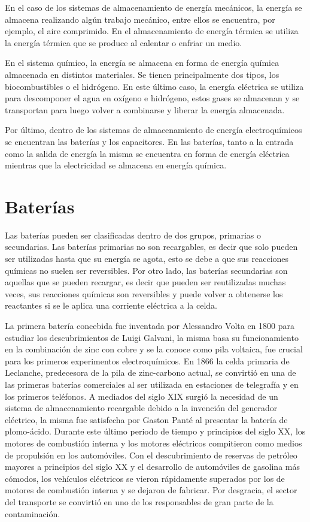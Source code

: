 En el caso de los sistemas de almacenamiento de energía mecánicos, la energía se
almacena realizando algún trabajo mecánico, entre ellos se encuentra, por ejemplo,
el aire comprimido. En el almacenamiento de energía térmica se utiliza la energía 
térmica que se produce al calentar o enfriar un medio.

En el sistema químico, la energía se almacena en forma de energía química 
almacenada en distintos materiales. Se tienen principalmente dos tipos, los
biocombustibles o el hidrógeno. En este último caso, la energía eléctrica se 
utiliza para descomponer el agua en oxígeno e hidrógeno, estos gases se almacenan 
y se transportan para luego volver a combinarse y liberar la energía almacenada.

Por último, dentro de los sistemas de almacenamiento de energía electroquímicos 
se encuentran las baterías y los capacitores. En las baterías, tanto a la entrada 
como la salida de energía la misma se encuentra en forma de energía eléctrica 
mientras que la electricidad se almacena en energía química. 


\section{Baterías}

Las baterías pueden ser clasificadas dentro de dos grupos, primarias o 
secundarias. Las baterías primarias no son recargables, es decir que solo pueden
ser utilizadas hasta que su energía se agota, esto se debe a que sus reacciones
químicas no suelen ser reversibles. Por otro lado, las baterías secundarias son 
aquellas que se pueden recargar, es decir que pueden ser reutilizadas muchas 
veces, sus reacciones químicas son reversibles y puede volver a obtenerse los 
reactantes si se le aplica una corriente eléctrica a la celda.

La primera batería concebida fue inventada por Alessandro Volta en 1800 para 
estudiar los descubrimientos de Luigi Galvani, la misma basa su funcionamiento 
en la combinación de zinc con cobre y se la conoce como pila voltaica, fue 
crucial para los primeros experimentos electroquímicos. En 1866 la celda primaria 
de Leclanche, predecesora de la pila de zinc-carbono actual, se convirtió en una
de las primeras baterías comerciales al ser utilizada en estaciones de telegrafía
y en los primeros teléfonos. A mediados del siglo XIX surgió la necesidad de un 
sistema de almacenamiento recargable debido a la invención del generador 
eléctrico, la misma fue satisfecha por Gaston Panté al presentar la batería de 
plomo-ácido. Durante este último periodo de tiempo y principios del siglo XX, 
los motores de combustión interna y los motores eléctricos compitieron como medios
de propulsión en los automóviles. Con el descubrimiento de reservas de petróleo 
mayores a principios del siglo XX y el desarrollo de automóviles de gasolina más
cómodos, los vehículos eléctricos se vieron rápidamente superados por los de 
motores de combustión interna y se dejaron de fabricar. Por desgracia, el sector 
del transporte se convirtió en uno de los responsables de gran parte de la 
contaminación.

